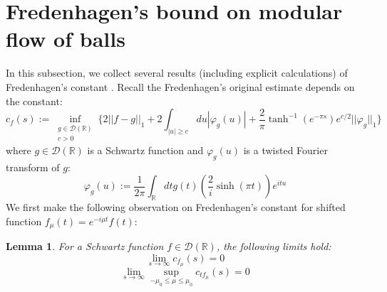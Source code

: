 \documentclass[a4paper,11pt]{article}
\newtheorem{lemma}[theorem]{Lemma}
\theoremstyle{definition}
\theoremstyle{remark}
\newcommand{\lb}{\left(}
\newcommand{\rb}{\right)}
\begin{document}
\section{Fredenhagen's bound on modular flow of balls}\label{subsection:gaussiansmear}

In this subsection, we collect several results (including explicit calculations) of Fredenhagen's constant \cite{fredenhagen}. Recall the Fredenhagen's original estimate depends on the constant:
\begin{equation}
    c_f(s):=\inf_{\substack{g\in\mathcal{D}(\mathbb{R})\\ c > 0}}\{2||f - g||_1 + 2\int_{|u|\geq c}du|\varphi_g(u)| + \frac{2}{\pi}\tanh^{-1}(e^{-\pi s})e^{c/2}||\varphi_g||_1\}
\end{equation}
where $g\in\mathcal{D}(\mathbb{R})$ is a Schwartz function and $\varphi_g(u)$ is  a twisted Fourier transform of $g$:
\begin{equation}
    \varphi_g(u):=\frac{1}{2\pi}\int_\mathbb{R} dt g(t)\lb\frac{2}{i}\sinh(\pi t)\rb e^{itu}
\end{equation}
We first make the following observation on Fredenhagen's constant for shifted function $f_\mu(t) = e^{-i\mu t}f(t)$:
\begin{lemma}\label{lemma:shiftedfredenhagenconstant}
    For a Schwartz function $f\in \mathcal{D}(\mathbb{R})$, the following limits hold:
    \begin{equation}
        \lim_{s\rightarrow\infty}c_{f_\mu}(s) = 0
    \end{equation}
    \begin{equation}
        \lim_{s\rightarrow\infty}\sup_{-\mu_0\leq \mu\leq\mu_0}c_{tf_\mu}(s) = 0
    \end{equation}
\end{lemma}
\end{document}
